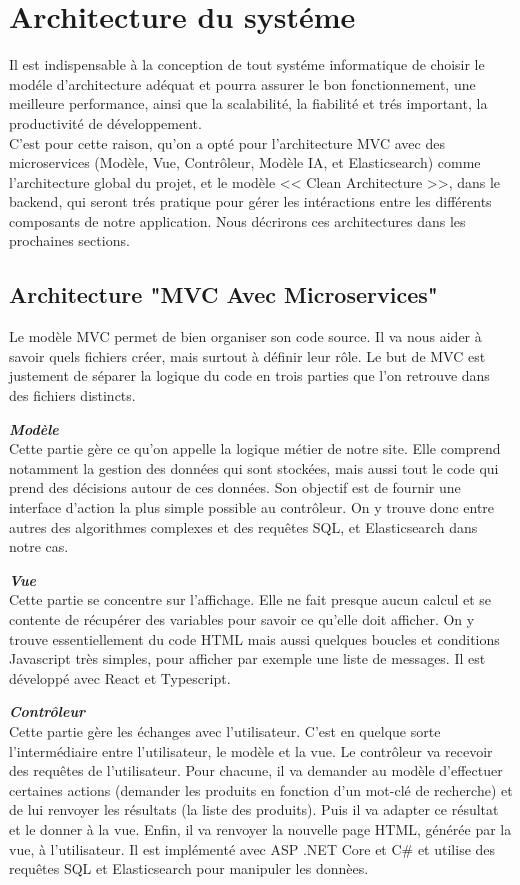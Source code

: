 \section{Architecture du systéme}
\noindent
Il est indispensable à la conception de tout systéme informatique de choisir le modéle d'architecture adéquat et pourra assurer le bon fonctionnement, une meilleure performance, ainsi que la scalabilité, la fiabilité et trés important, la productivité de développement. \\
C'est pour cette raison, qu'on a opté pour l'architecture MVC avec des microservices (Modèle, Vue, Contrôleur, Modèle IA, et Elasticsearch) comme l'architecture global du projet, et le modèle << Clean Architecture >>, dans le backend, qui seront trés pratique pour gérer les intéractions entre les différents composants de notre application. Nous décrirons ces architectures dans les prochaines sections.

\subsection{Architecture "MVC Avec Microservices"}
\noindent
Le modèle MVC permet de bien organiser son code source. Il va nous aider à savoir quels fichiers créer, mais surtout à définir leur rôle. Le but de MVC est justement de séparer la logique du code en trois parties que l'on retrouve dans des fichiers distincts.

\noindent
{\small\textbf{\textit{Modèle}}}\mbox{}\\
Cette partie gère ce qu'on appelle la logique métier de notre site. Elle comprend notamment la gestion des données qui sont stockées, mais aussi tout le code qui prend des décisions autour de ces données. Son objectif est de fournir une interface d'action la plus simple possible au contrôleur. On y trouve donc entre autres des algorithmes complexes et des requêtes SQL, et Elasticsearch dans notre cas.

\noindent
{\small\textbf{\textit{Vue}}}\mbox{}\\
Cette partie se concentre sur l'affichage. Elle ne fait presque aucun calcul et se contente de récupérer des variables pour savoir ce qu'elle doit afficher. On y trouve essentiellement du code HTML mais aussi quelques boucles et conditions Javascript très simples, pour afficher par exemple une liste de messages. Il est développé avec React et Typescript.

\noindent
{\small\textbf{\textit{Contrôleur}}}\mbox{}\\
Cette partie gère les échanges avec l'utilisateur. C'est en quelque sorte l'intermédiaire entre l'utilisateur, le modèle et la vue. Le contrôleur va recevoir des requêtes de l'utilisateur. Pour chacune, il va demander au modèle d'effectuer certaines actions (demander les produits en fonction d'un mot-clé de recherche) et de lui renvoyer les résultats (la liste des produits). Puis il va adapter ce résultat et le donner à la vue. Enfin, il va renvoyer la nouvelle page HTML, générée par la vue, à l'utilisateur. Il est implémenté avec ASP .NET Core et C\# et utilise des requêtes SQL et Elasticsearch pour manipuler les donnèes.

